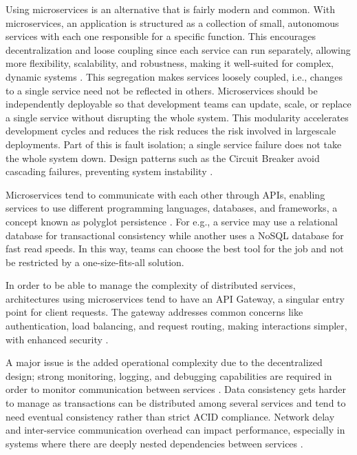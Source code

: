 \documentclass[]{final}
\begin{document}
Using microservices is an alternative that is fairly modern and common.
With microservices, an application is structured as a collection of small,
autonomous services with each one responsible for a specific function. This encourages decentralization
and loose coupling since each service can run separately, allowing more flexibility,
scalability, and robustness, making it well-suited for complex, dynamic systems \cite{robbagby_microservice_nodate}.
This segregation makes services loosely coupled, i.e., changes to a single service need not be reflected in others.
Microservices should be independently deployable so that development teams can update,
scale, or replace a single service without disrupting the whole system. This
modularity accelerates development cycles and reduces the risk reduces the
risk involved in largescale deployments. Part of this is fault isolation; a
single service failure does not take the whole system down.
Design patterns such as the Circuit Breaker avoid cascading failures, preventing system instability \cite{robbagby_microservice_nodate}.

Microservices tend to communicate with each other through APIs, enabling
services to use different programming languages, databases, and frameworks,
a concept known as polyglot persistence \cite{robbagby_microservice_nodate}. For e.g., a service may use
a relational database for transactional consistency while another uses a NoSQL
database for fast read speeds. In this way,
teams can choose the best tool for the job and not be restricted by
a one-size-fits-all solution.

In order to be able to manage the complexity of distributed services, architectures using microservices
tend to have an API Gateway, a singular entry point for client requests. The gateway addresses
common concerns like authentication, load balancing, and request routing, making interactions simpler,
with enhanced security \cite{robbagby_microservice_nodate}.

\label{microservice_issue}

A major issue is the added operational complexity due to the decentralized
design; strong monitoring, logging, and debugging capabilities are required in
order to monitor communication between services \cite{robbagby_microservice_nodate}.
Data consistency gets harder to manage as transactions can be distributed among
several services and tend to need eventual consistency rather than strict ACID
compliance. Network delay and inter-service communication overhead can impact
performance, especially in systems where there are deeply nested dependencies
between services \cite{robbagby_microservice_nodate}.
\end{document}
